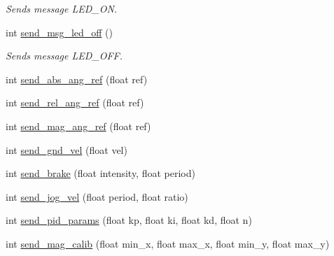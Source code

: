 \begin{DoxyCompactItemize}
\begin{DoxyCompactList}\small\item\em Sends message L\+E\+D\+\_\+\+ON. \end{DoxyCompactList}\item 
int \hyperlink{classSender_a224a07f8f7d1e150a2d55ef826149121}{send\+\_\+msg\+\_\+led\+\_\+off} ()\hypertarget{classSender_a224a07f8f7d1e150a2d55ef826149121}{}\label{classSender_a224a07f8f7d1e150a2d55ef826149121}

\begin{DoxyCompactList}\small\item\em Sends message L\+E\+D\+\_\+\+O\+FF. \end{DoxyCompactList}\item 
int \hyperlink{classSender_af6b81ecc0e0681f7319d7c1c00c87342}{send\+\_\+abs\+\_\+ang\+\_\+ref} (float ref)
\item 
int \hyperlink{classSender_a2b96697abbe41d9c6859a4f76b3c6cb6}{send\+\_\+rel\+\_\+ang\+\_\+ref} (float ref)
\item 
int \hyperlink{classSender_a75c26041665a84c10188d30a3d66d92b}{send\+\_\+mag\+\_\+ang\+\_\+ref} (float ref)
\item 
int \hyperlink{classSender_a5481155d916e285a6a5aea6d15b65ff3}{send\+\_\+gnd\+\_\+vel} (float vel)
\item 
int \hyperlink{classSender_a0f766c1d8717e44ff355de0c94d2d37a}{send\+\_\+brake} (float intensity, float period)
\item 
int \hyperlink{classSender_a4dbfac20c2bb47fb3059177847cb3a0c}{send\+\_\+jog\+\_\+vel} (float period, float ratio)
\item 
int \hyperlink{classSender_a45e907040a2c705cadcd207f46d31b72}{send\+\_\+pid\+\_\+params} (float kp, float ki, float kd, float n)
\item 
int \hyperlink{classSender_adaabd2ca227ee641c98448c80bc8b995}{send\+\_\+mag\+\_\+calib} (float min\+\_\+x, float max\+\_\+x, float min\+\_\+y, float max\+\_\+y)
\end{DoxyCompactItemize}
